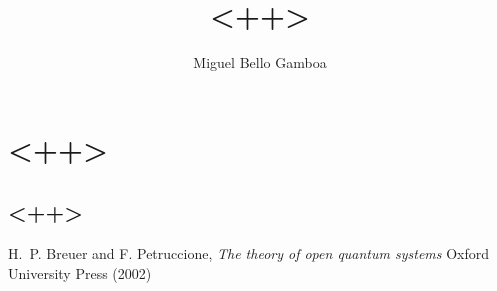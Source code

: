 \documentclass[11pt,a4paper]{article}
\begin{document}
\title{<++>}
\author{Miguel Bello Gamboa}
\maketitle


\section{<++>}
\subsection{<++>}


\begin{thebibliography}{4}
 
   H.~P. Breuer and F. Petruccione,
 \textit{The theory of open quantum systems}
 Oxford University Press (2002)
 
\end{thebibliography} 
\end{document}
